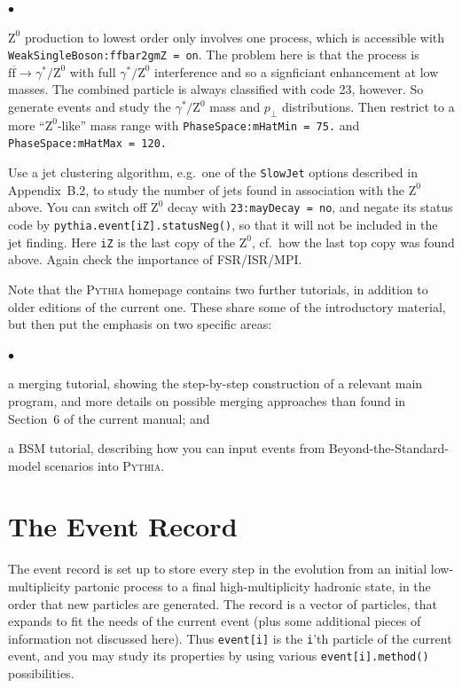 \documentclass[12pt,a4paper]{article}
\newcommand{\pT}{p_{\perp}}
\newcommand{\f}{{\mathrm f}}
\newcommand{\Z}{{\mathrm Z}}
\newcommand{\fbar}{\overline{\mathrm f}}
\newenvironment{Itemize}{\begin{list}{$\bullet$}%
{\setlength{\topsep}{0.4mm}\setlength{\partopsep}{0.4mm}%
\setlength{\itemsep}{0.4mm}\setlength{\parsep}{0.4mm}}}%
{\end{list}}
\begin{document}
\begin{Itemize}
\item $\Z^0$ production to lowest order only involves one process,
which is accessible with \texttt{WeakSingleBoson:ffbar2gmZ = on}. 
The problem here is that the process is $\f \fbar \to \gamma^*/\Z^0$ 
with full $\gamma^*/\Z^0$ interference and so a signficiant enhancement 
at low masses. The combined particle is always classified with code 23,
however. So generate events and study the $\gamma^*/\Z^0$ mass and
$\pT$ distributions. Then restrict to a more ``$\Z^0$-like''  
mass range with \texttt{PhaseSpace:mHatMin = 75.} and 
\texttt{PhaseSpace:mHatMax = 120.}

\item Use a jet clustering algorithm, e.g.\ one of the \texttt{SlowJet}
options described in Appendix~B.2, to study the number of jets found in 
association with the $\Z^0$ above. You can switch off $\Z^0$ decay with 
\texttt{23:mayDecay = no}, and negate its status code by
\texttt{pythia.event[iZ].statusNeg()}, so that it will not be included
in the jet finding. Here \texttt{iZ} is the last copy of the $\Z^0$,
cf.\ how the last top copy was found above.
Again check the importance of FSR/ISR/MPI. 
\end{Itemize}

Note that the \textsc{Pythia} homepage contains two further tutorials,
in addition to older editions of the current one. These share some
of the introductory material, but then put the emphasis on two 
specific areas:
\begin{Itemize}
\item a merging tutorial, showing the step-by-step construction of 
a relevant main program, and more details on possible merging 
approaches than found in Section~6 of the current manual; and
\item a BSM tutorial, describing how you can input events from
Beyond-the-Standard-model scenarios into \textsc{Pythia}.
\end{Itemize}
 

\appendix
\section{The Event Record}

The event record is set up to store every step in the evolution from 
an initial low-multiplicity partonic process to a final high-multiplicity
hadronic state, in the order that new particles are generated. The record
is a vector of particles, that expands to fit the needs of the current 
event (plus some additional pieces of information not discussed here). 
Thus \texttt{event[i]} is the \texttt{i}'th particle of the current 
event, and you may study its properties by using various 
\texttt{event[i].method()} possibilities.
\end{document}
